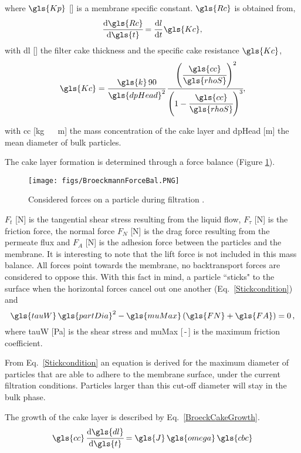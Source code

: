 where $\gls{Kp}$ [\reciprocal\metre] is a membrane specific constant. $\gls{Rc}$ is obtained from,
\begin{equation}
\cfrac{\mathrm{d}\gls{Rc}}{\mathrm{d} \gls{t}} = \cfrac{\mathrm{d} l}{\mathrm{d}t}\, \gls{Kc}
\label{BroekCake} ,
\end{equation}
with \gls{dl} [\unit{}{\metre}] the filter cake thickness and the specific cake resistance $\gls{Kc}$,
\begin{equation}
\gls{Kc} = \cfrac{ \gls{k}\, 90}{\gls{dpHead}^2}\, \cfrac{ \left( \cfrac{ \gls{cc}}{\gls{rhoS}} \right) ^2}{\left( 1-\cfrac{ \gls{cc}}{\gls{rhoS}} \right) ^3}
\label{BroekBlakeKozeny} ,
\end{equation}

with \gls{cc} [\unit{\kilogram\, \rpcubic\metre}] the mass concentration of the cake layer and \gls{dpHead} [\unit{\metre}] the mean diameter of bulk particles. \par
The cake layer formation is determined through a force balance (Figure \ref{BroeckmannForceBal}). \par
\begin{figure}[H]
\begin{center}
\hspace{-1.5cm}
\texttt{[image: figs/BroeckmannForceBal.PNG]}
\caption{Considered forces on a particle during filtration \citep{Broeckmann2006}.\label{BroeckmannForceBal}}
\end{center}
\end{figure}
$F_t$ [\unit{\newton}] is the tangential shear stress resulting from the liquid flow, $F_{\tau}$ [\unit{\newton}] is the friction force, the normal force $F_N$ [\unit{\newton}] is the drag force resulting from the permeate flux and $F_A$ [\unit{\newton}] is the adhesion force between the particles and the membrane. It is interesting to note that the lift force is not included in this mass balance. All forces point towards the membrane, no backtransport forces are considered to oppose this. With this fact in mind, a particle ``sticks" to the surface when the horizontal forces cancel out one another (Eq.\ \ref{Stickcondition}) and 
\begin{equation}
\gls{tauW}\, \gls{partDia}^2-\gls{muMax}\, (\gls{FN} + \gls{FA}) =  0 \, ,
\label{Stickcondition}
\end{equation}
where \gls{tauW} [\unit{\pascal}] is the shear stress and \gls{muMax} [\,-\,] is the maximum friction coefficient. \par
From Eq.\ \ref{Stickcondition} an equation is derived for the maximum diameter of particles that are able to adhere to the membrane surface, under the current filtration conditions. Particles larger than this cut-off diameter will stay in the bulk phase.\par
The growth of the cake layer is described by  Eq.\ \ref{BroeckCakeGrowth}. 
\begin{equation}
\gls{cc} \, \cfrac{\mathrm{d}\gls{dl}}{\mathrm{d} \gls{t}} = \gls{J}\, \gls{omega} \, \gls{cbc}
\label{BroeckCakeGrowth}
\end{equation}

